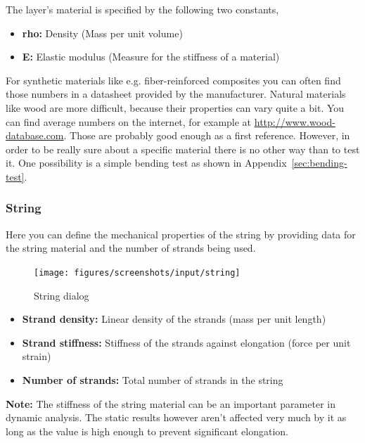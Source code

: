 \documentclass[12pt]{article}
\begin{document}
The layer's material is specified by the following two constants,

\begin{itemize}
\item \textbf{rho:} Density (Mass per unit volume)
\item \textbf{E:} Elastic modulus (Measure for the stiffness of a material)
\end{itemize}

For synthetic materials like e.g. fiber-reinforced composites you can often find those numbers in a datasheet provided by the manufacturer.
Natural materials like wood are more difficult, because their properties can vary quite a bit.
You can find average numbers on the internet, for example at \url{http://www.wood-database.com}.
Those are probably good enough as a first reference.
However, in order to be really sure about a specific material there is no other way than to test it.
One possibility is a simple bending test as shown in Appendix~\ref{sec:bending-test}.

\newpage
\subsubsection{String}

Here you can define the mechanical properties of the string by providing data for the string material and the number of strands being used.

\bigskip

\begin{figure}[H]
\centering
\texttt{[image: figures/screenshots/input/string]}
\caption{String dialog}
\label{fig:string}
\end{figure}

\begin{itemize}
\item \textbf{Strand density:} Linear density of the strands (mass per unit length)
\item \textbf{Strand stiffness:} Stiffness of the strands against elongation (force per unit strain)
\item \textbf{Number of strands:} Total number of strands in the string
\end{itemize}

\bigskip

\textbf{Note:} The stiffness of the string material can be an important parameter in dynamic analysis.
The static results however aren't affected very much by it as long as the value is high enough to prevent significant elongation.
\end{document}
